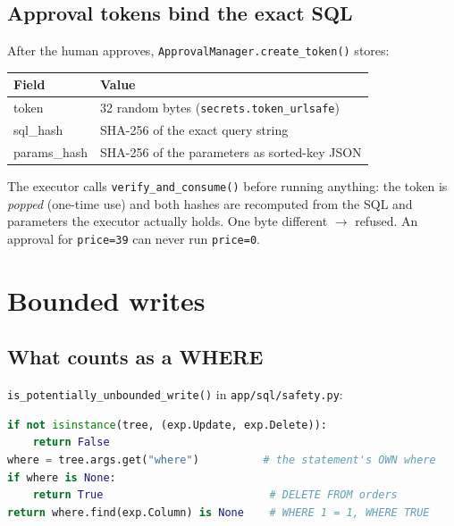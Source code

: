 \documentclass[11pt,a4paper]{article}
\begin{document}
\subsection*{Approval tokens bind the exact SQL}
After the human approves, \texttt{ApprovalManager.create\_token()} stores:

\begin{center}
\begin{tabular}{@{}ll@{}}
\toprule
\textbf{Field} & \textbf{Value} \\
\midrule
token       & 32 random bytes (\texttt{secrets.token\_urlsafe}) \\
sql\_hash   & SHA-256 of the exact query string \\
params\_hash& SHA-256 of the parameters as sorted-key JSON \\
\bottomrule
\end{tabular}
\end{center}

The executor calls \texttt{verify\_and\_consume()} before running anything:
the token is \emph{popped} (one-time use) and both hashes are recomputed from
the SQL and parameters the executor actually holds. One byte different
$\rightarrow$ refused. An approval for \texttt{price=39} can never run
\texttt{price=0}.

\section{Bounded writes}
\label{sec:bounded}

\subsection*{What counts as a WHERE}
\texttt{is\_potentially\_unbounded\_write()} in \texttt{app/sql/safety.py}:

\begin{lstlisting}[language=Python]
if not isinstance(tree, (exp.Update, exp.Delete)):
    return False
where = tree.args.get("where")          # the statement's OWN where
if where is None:
    return True                          # DELETE FROM orders
return where.find(exp.Column) is None    # WHERE 1 = 1, WHERE TRUE
\end{lstlisting}
\end{document}
